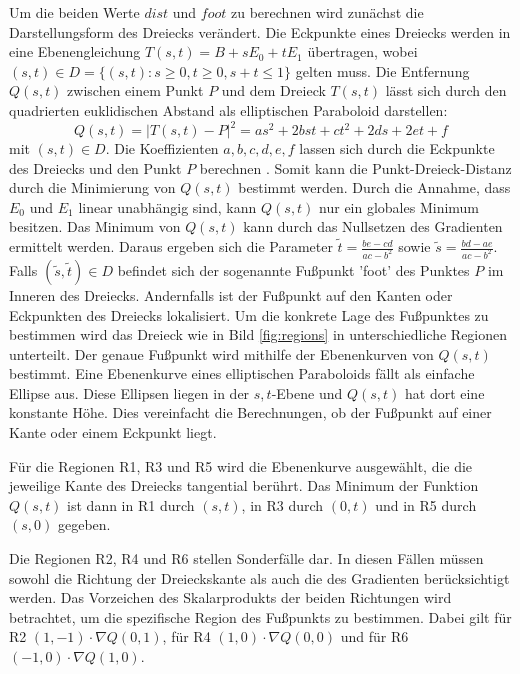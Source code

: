 \documentclass[conference]{IEEEtran}
\begin{document}
Um die beiden Werte $dist$ und $foot$ zu berechnen wird zunächst die Darstellungsform des Dreiecks verändert. Die Eckpunkte eines Dreiecks werden in eine Ebenengleichung $ T(s,t) = B + sE_0 + tE_1 $ übertragen, wobei $(s, t) \in D = \{(s,t): s \geq 0, t \geq 0, s + t \leq 1 \}$ gelten muss. Die Entfernung $Q(s,t)$ zwischen einem Punkt $P$ und dem Dreieck $T(s,t)$ lässt sich durch den quadrierten euklidischen Abstand als elliptischen Paraboloid darstellen: 
\begin{equation}
    Q(s,t) = |T(s,t) - P|^2 = as^2 + 2bst + ct^2 + 2ds + 2et + f
\end{equation}
mit $(s,t) \in D$. Die Koeffizienten $a, b, c, d, e, f$ lassen sich durch die Eckpunkte des Dreiecks und den Punkt $P$ berechnen \autocite*{eberlyDistancePointTriangle}. Somit kann die Punkt-Dreieck-Distanz durch die Minimierung von $Q(s,t)$ bestimmt werden. Durch die Annahme, dass $E_0$ und $E_1$ linear unabhängig sind, kann $Q(s,t)$ nur ein globales Minimum besitzen. Das Minimum von $Q(s,t)$ kann durch das Nullsetzen des Gradienten ermittelt werden. Daraus ergeben sich die Parameter $\tilde{t} = \frac{be-cd}{ac-b^2}$ sowie $\tilde{s} = \frac{bd-ae}{ac-b^2}$. Falls $(\tilde{s}, \tilde{t}) \in D$ befindet sich der sogenannte Fußpunkt 'foot' des Punktes $P$ im Inneren des Dreiecks. Andernfalls ist der Fußpunkt auf den Kanten oder Eckpunkten des Dreiecks lokalisiert. Um die konkrete Lage des Fußpunktes zu bestimmen wird das Dreieck wie in Bild \ref{fig:regions} in unterschiedliche Regionen unterteilt. Der genaue Fußpunkt wird mithilfe der Ebenenkurven von $Q(s, t)$ bestimmt. Eine Ebenenkurve eines elliptischen Paraboloids fällt als einfache Ellipse aus. Diese Ellipsen liegen in der $s, t$-Ebene und $Q(s, t)$ hat dort eine konstante Höhe. Dies vereinfacht die Berechnungen, ob der Fußpunkt auf einer Kante oder einem Eckpunkt liegt. 

Für die Regionen R1, R3 und R5 wird die Ebenenkurve ausgewählt, die die jeweilige Kante des Dreiecks tangential berührt. Das Minimum der Funktion $Q(s,t)$ ist dann in R1 durch $(s,t)$, in R3 durch $(0,t)$ und in R5 durch $(s,0)$ gegeben.

Die Regionen R2, R4 und R6 stellen Sonderfälle dar. In diesen Fällen müssen sowohl die Richtung der Dreieckskante als auch die des Gradienten berücksichtigt werden. Das Vorzeichen des Skalarprodukts der beiden Richtungen wird betrachtet, um die spezifische Region des Fußpunkts zu bestimmen. Dabei gilt für R2 $(1,-1)\cdot \nabla Q(0,1)$, für R4 $(1,0)\cdot\nabla Q(0,0)$ und für R6 $(-1,0)\cdot\nabla Q(1,0)$. 
\end{document}
